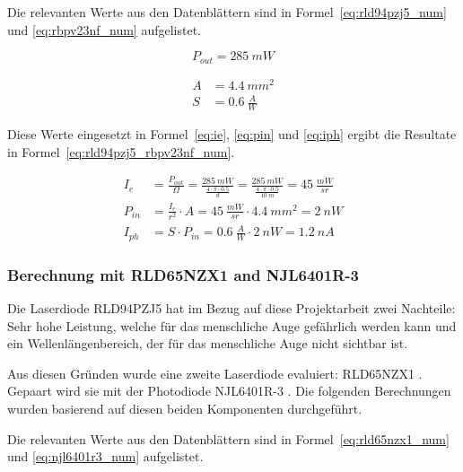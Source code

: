 Die relevanten Werte aus den Datenblättern sind in Formel~\ref{eq:rld94pzj5_num} und \ref{eq:rbpv23nf_num} aufgelistet.

\begin{equation}\label{eq:rld94pzj5_num}
    P_{out} = 285~mW
\end{equation}

\begin{equation}\label{eq:rbpv23nf_num}
    \begin{split}
        A &= 4.4~mm^2\\
        S &= 0.6~\frac{A}{W}
    \end{split}
\end{equation}

Diese Werte eingesetzt in Formel~\ref{eq:ie}, \ref{eq:pin} und \ref{eq:iph} ergibt die Resultate in
Formel~\ref{eq:rld94pzj5_rbpv23nf_num}.

\begin{equation}\label{eq:rld94pzj5_rbpv23nf_num}
    \begin{split}
        I_e    &= \frac{P_{out}}{\Omega} = \frac{285~mW}{\frac{4\cdot \pi \cdot 0.5}{d}} = \frac{285~mW}{\frac{4\cdot \pi \cdot 0.5}{10~m}} = 45~\frac{mW}{sr}\\
        P_{in} &= \frac{I_e}{r^2} \cdot A = 45~\frac{mW}{sr} \cdot 4.4~mm^2 = 2~nW\\
        I_{ph} &= S \cdot P_{in} = 0.6~\frac{A}{W} \cdot 2~nW = 1.2~nA
    \end{split}
\end{equation}

\subsubsection{Berechnung mit RLD65NZX1 and NJL6401R-3}

Die Laserdiode RLD94PZJ5 hat im Bezug auf diese Projektarbeit zwei Nachteile: Sehr hohe Leistung, welche für das
menschliche Auge gefährlich werden kann und ein Wellenlängenbereich, der für das menschliche Auge nicht sichtbar ist.

Aus diesen Gründen wurde eine zweite Laserdiode evaluiert: RLD65NZX1 \cite{rohm2019rld65nzx1_datasheet}. Gepaart wird
sie mit der Photodiode NJL6401R-3 \cite{jrc2014njl6401r3_datasheet}. Die folgenden Berechnungen wurden basierend auf
diesen beiden Komponenten durchgeführt.

Die relevanten Werte aus den Datenblättern sind in Formel~\ref{eq:rld65nzx1_num} und \ref{eq:njl6401r3_num} aufgelistet.

